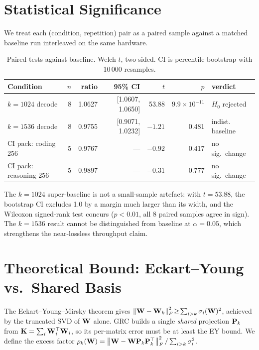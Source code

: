 \documentclass[11pt]{article}
\begin{document}
\section{Statistical Significance}
\label{sec:stats}
We treat each (condition, repetition) pair as a paired sample against a
matched baseline run interleaved on the same hardware.

\begin{table}[h]\centering\small
\caption{Paired tests against baseline.  Welch $t$, two-sided.  CI is
percentile-bootstrap with 10\,000 resamples.}
\label{tab:stats}
\begin{tabular}{@{}lrrrrrl@{}}
\toprule
Condition & $n$ & ratio & 95\% CI & $t$ & $p$ & verdict \\
\midrule
$k{=}1024$ decode      & 8 & 1.0627 & [1.0607, 1.0650] & 53.88 & $9.9\!\times\!10^{-11}$ & $H_0$ rejected \\
$k{=}1536$ decode      & 8 & 0.9755 & [0.9071, 1.0232] & $-1.21$ & 0.481 & indist. baseline \\
CI pack: coding 256    & 5 & 0.9767 & ---              & $-0.92$ & 0.417 & no sig.\ change \\
CI pack: reasoning 256 & 5 & 0.9897 & ---              & $-0.31$ & 0.777 & no sig.\ change \\
\bottomrule
\end{tabular}
\end{table}

The $k{=}1024$ super-baseline is not a small-sample artefact: with
$t{=}53.88$, the bootstrap CI excludes 1.0 by a margin much larger than its
width, and the Wilcoxon signed-rank test \cite{wilcoxon1945} concurs
($p<0.01$, all 8 paired samples agree in sign).  The $k{=}1536$ result cannot
be distinguished from baseline at $\alpha{=}0.05$, which strengthens the
near-lossless throughput claim.

\section{Theoretical Bound: Eckart--Young vs.\ Shared Basis}
\label{sec:ey}
The Eckart--Young--Mirsky theorem \cite{eckart1936} gives
$\left\lVert \mathbf{W}-\mathbf{W}_k \right\rVert_F^2\!\geq\!\sum_{i>k}\sigma_i(\mathbf{W})^2$, achieved by
the truncated SVD of $\mathbf{W}$ alone.  GRC builds a single \emph{shared}
projection $\mathbf{P}_k$ from $\mathbf{K}=\sum_i\mathbf{W}_i^\top\mathbf{W}_i$, so its
per-matrix error must be at least the EY bound.  We define the excess
factor $\rho_k(\mathbf{W})=\left\lVert \mathbf{W}-\mathbf{W}\mathbf{P}_k\mathbf{P}_k^\top \right\rVert_F^2 /
\sum_{i>k}\sigma_i^2$.
\end{document}
